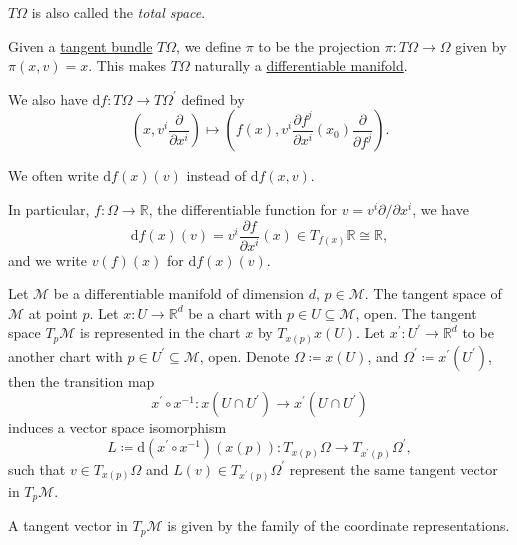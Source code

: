 \begin{note}
	\(T \Omega \) is also called the \emph{total space}.
\end{note}

\begin{remark}
	Given a \hyperref[def:tangent-bundle-of-Euclidean-space]{tangent bundle} \(T \Omega \), we define \(\pi \) to be the projection \(\pi \colon T \Omega \to \Omega\) given by \(\pi (x, v) = x\). This makes \(T \Omega \) naturally a \hyperref[def:smooth-manifold]{differentiable manifold}.
\end{remark}

We also have \(\mathrm{d} f\colon T \Omega \to T \Omega ^\prime \) defined by
\[
	\left( x, v^i \frac{\partial }{\partial x^i} \right) \mapsto \left( f(x), v^i \frac{\partial f^j}{\partial x^i} (x_0) \frac{\partial }{\partial f^j}  \right).
\]

\begin{notation}
	We often write \(\mathrm{d} f(x)(v)\) instead of \(\mathrm{d} f(x, v)\).
\end{notation}

In particular, \(f\colon \Omega \to  \mathbb{R} \), the differentiable function for \(v = v^i \partial / \partial x^i\), we have
\[
	\mathrm{d} f(x)(v) = v^i \frac{\partial f}{\partial x^i} (x)\in T_{f(x)}\mathbb{R} \cong \mathbb{R},
\]
and we write \(v(f)(x)\) for \(\mathrm{d} f(x)(v)\).

Let \(\mathcal{M} \) be a differentiable manifold of dimension \(d\), \(p\in \mathcal{M} \). The tangent space of \(\mathcal{M} \) at point \(p\). Let \(x\colon U \to  \mathbb{R} ^d\) be a chart with \(p\in U \subseteq \mathcal{M} \), open. The tangent space \(T_p \mathcal{M} \) is represented in the chart \(x\) by \(T_{x(p)}x(U)\). Let \(x^\prime \colon U^\prime \to \mathbb{R} ^d\) to be another chart with \(p\in U^\prime \subseteq \mathcal{M} \), open. Denote \(\Omega \coloneqq x(U)\), and \(\Omega ^\prime \coloneqq x^\prime (U^\prime )\), then the transition map
\[
	x^\prime \circ x^{-1} \colon x(U \cap U^\prime )\to x^\prime (U \cap U^\prime )
\]
induces a vector space isomorphism
\[
	L\coloneqq \mathrm{d} (x^\prime \circ x ^{-1} )(x(p)) \colon T_{x(p)}\Omega \to  T_{x^\prime (p)}\Omega ^\prime,
\]
such that \(v\in T_{x(p)}\Omega \) and \(L(v)\in T_{x^\prime (p)}\Omega ^\prime \) represent the same tangent vector in \(T_p \mathcal{M} \).

\begin{remark}
	A tangent vector in \(T_p \mathcal{M} \) is given by the family of the coordinate representations.
\end{remark}

